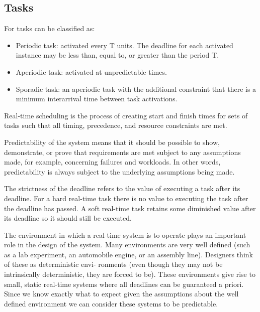 \documentclass[12pt]{article}
\begin{document}

\subsection{Tasks}

For \cite{stankovic1996real} tasks can be classified as:

\begin{itemize}
  \item Periodic task: activated every T units. The deadline for each activated instance may be less than, equal to, 
or greater than the period T.
  \item Aperiodic task: activated at unpredictable times.
  \item Sporadic task: an aperiodic task with the additional constraint that there is a minimum interarrival time 
between task activations.
\end{itemize}

Real-time scheduling is the process of creating start and finish times for sets of tasks such that
all timing, precedence, and resource constraints are met.

\iffalse

Predictability of the system means that it should be possible to show, demonstrate, or prove that requirements are
met subject to any assumptions made, for example, concerning failures and workloads. In other words, 
predictability is always subject to the underlying assumptions being made.

The strictness of the deadline refers to the value of executing a task after its deadline. For a hard real-time 
task there is no value to executing the task after the deadline has passed. A soft real-time task retains some 
diminished value after its deadline so it should still be executed.

The environment in which a real-time system is to operate plays an important role in the
design of the system. Many environments are very well defined (such as a lab experiment,
an automobile engine, or an assembly line). Designers think of these as deterministic envi-
ronments (even though they may not be intrinsically deterministic, they are forced to be).
These environments give rise to small, static real-time systems where all deadlines can
be guaranteed a priori. Since we know exactly what to expect given the assumptions about the 
well defined environment we can consider these systems to be predictable.
\end{document}

